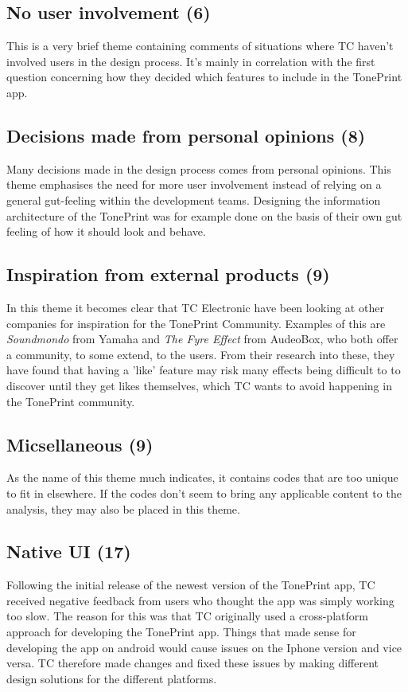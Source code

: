 \subsection*{No user involvement (6)} 
\label{App:ThemeNoUserInvolvement}
This is a very brief theme containing comments of situations where TC haven't involved users in the design process. It's mainly in correlation with the first question concerning how they decided which features to include in the TonePrint app.

\subsection*{Decisions made from personal opinions (8)} 
\label{App:ThemeDecisionsMadeFromPersonalOpinions}
Many decisions made in the design process comes from personal opinions. This theme emphasises the need for more user involvement instead of relying on a general gut-feeling within the development teams. Designing the information architecture of the TonePrint was for example done on the basis of their own gut feeling of how it should look and behave.

\subsection*{Inspiration from external products (9)} 
\label{App:ThemeInspirationFromExternalProducts}
In this theme it becomes clear that TC Electronic have been looking at other companies for inspiration for the TonePrint Community. Examples of this are \textit{Soundmondo} from Yamaha and \textit{The Fyre Effect} from AudeoBox, who both offer a community, to some extend, to the users. From their research into these, they have found that having a 'like' feature may risk many effects being difficult to to discover until they get likes themselves, which TC wants to avoid happening in the TonePrint community.

\subsection*{Micsellaneous (9)} 
\label{App:ThemeMiscellaneous}
As the name of this theme much indicates, it contains codes that are too unique to fit in elsewhere. If the codes don't seem to bring any applicable content to the analysis, they may also be placed in this theme.

\subsection*{Native UI (17)}
\label{App:ThemeNativeUI}
Following the initial release of the newest version of the TonePrint app, TC received negative feedback from users who thought the app was simply working too slow. The reason for this was that TC originally used a cross-platform approach for developing the TonePrint app. Things that made sense for developing the app on android would cause issues on the Iphone version and vice versa. TC therefore made changes and fixed these issues by making different design solutions for the different platforms.

